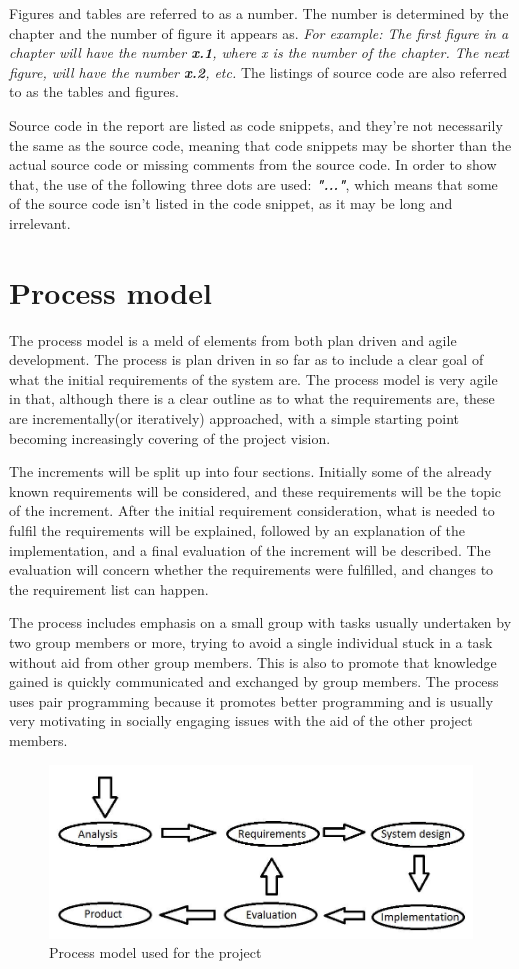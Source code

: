 Figures and tables are referred to as a number. The number is determined by the chapter and the number of figure it appears as. \newline
\textit{For example: The first figure in a chapter will have the number \textbf{x.1}, where x is the number of the chapter. The next figure, will have the number \textbf{x.2}, etc.}
\newline
The listings of source code are also referred to as the tables and figures. 

Source code in the report are listed as code snippets, and they're not necessarily the same as the source code, meaning that code snippets may be shorter than the actual source code or missing comments from the source code. In order to show that, the use of the following three dots are used: \textit\textbf{{"..."}}, which means that some of the source code isn't listed in the code snippet, as it may be long and irrelevant. 

\chapter*{Process model}
The process model is a meld of elements from both plan driven and agile development. The process is plan driven in so far as to include a clear goal of what the initial requirements of the system are. The process model is very agile in that, although there is a clear outline as to what the requirements are, these are incrementally(or iteratively) approached, with a simple starting point becoming increasingly covering of the project vision.

The increments will be split up into four sections. Initially some of the already known requirements will be considered, and these requirements will be the topic of the increment.
After the initial requirement consideration, what is needed to fulfil the requirements will be explained, followed by an explanation of the implementation, and a final evaluation of the increment will be described. The evaluation will concern whether the requirements were fulfilled, and changes to the requirement list can happen.

The process includes emphasis on a small group with tasks usually undertaken by two group members or more, trying to avoid a single individual stuck in a task without aid from other group members. This is also to promote that knowledge gained is quickly communicated and exchanged by group members. The process uses pair programming because it promotes better programming and is usually very motivating in socially engaging issues with the aid of the other project members.

\begin{figure}[h]
\centering
\includegraphics[scale=0.35]{billeder/process-model}
\caption{Process model used for the project}
\label{pm}
\end{figure}


